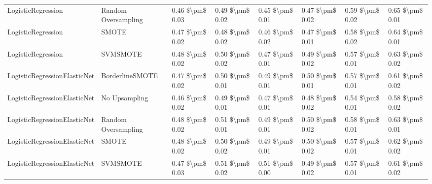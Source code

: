 \begin{tabular}{llllllll}
             LogisticRegression &           Random Oversampling & 0.46 \$\textbackslash pm\$ 0.03 &           0.49 \$\textbackslash pm\$ 0.02 &       0.45 \$\textbackslash pm\$ 0.01 &        0.47 \$\textbackslash pm\$ 0.02 &                         0.59 \$\textbackslash pm\$ 0.02 &     0.65 \$\textbackslash pm\$ 0.01 \\
             LogisticRegression &                         SMOTE & 0.47 \$\textbackslash pm\$ 0.02 &           0.48 \$\textbackslash pm\$ 0.02 &       0.46 \$\textbackslash pm\$ 0.02 &        0.47 \$\textbackslash pm\$ 0.01 &                         0.58 \$\textbackslash pm\$ 0.02 &     0.64 \$\textbackslash pm\$ 0.01 \\
             LogisticRegression &                      SVMSMOTE & 0.48 \$\textbackslash pm\$ 0.02 &           0.50 \$\textbackslash pm\$ 0.02 &       0.47 \$\textbackslash pm\$ 0.01 &        0.49 \$\textbackslash pm\$ 0.02 &                         0.57 \$\textbackslash pm\$ 0.01 &     0.63 \$\textbackslash pm\$ 0.02 \\
   LogisticRegressionElasticNet &               BorderlineSMOTE & 0.47 \$\textbackslash pm\$ 0.02 &           0.50 \$\textbackslash pm\$ 0.01 &       0.49 \$\textbackslash pm\$ 0.01 &        0.50 \$\textbackslash pm\$ 0.01 &                         0.57 \$\textbackslash pm\$ 0.01 &     0.61 \$\textbackslash pm\$ 0.02 \\
   LogisticRegressionElasticNet &                 No Upsampling & 0.46 \$\textbackslash pm\$ 0.02 &           0.49 \$\textbackslash pm\$ 0.01 &       0.47 \$\textbackslash pm\$ 0.01 &        0.48 \$\textbackslash pm\$ 0.02 &                         0.54 \$\textbackslash pm\$ 0.01 &     0.58 \$\textbackslash pm\$ 0.02 \\
   LogisticRegressionElasticNet &           Random Oversampling & 0.48 \$\textbackslash pm\$ 0.02 &           0.51 \$\textbackslash pm\$ 0.01 &       0.49 \$\textbackslash pm\$ 0.01 &        0.50 \$\textbackslash pm\$ 0.02 &                         0.58 \$\textbackslash pm\$ 0.01 &     0.63 \$\textbackslash pm\$ 0.01 \\
   LogisticRegressionElasticNet &                         SMOTE & 0.48 \$\textbackslash pm\$ 0.02 &           0.50 \$\textbackslash pm\$ 0.02 &       0.49 \$\textbackslash pm\$ 0.01 &        0.50 \$\textbackslash pm\$ 0.02 &                         0.57 \$\textbackslash pm\$ 0.01 &     0.62 \$\textbackslash pm\$ 0.02 \\
   LogisticRegressionElasticNet &                      SVMSMOTE & 0.47 \$\textbackslash pm\$ 0.03 &           0.51 \$\textbackslash pm\$ 0.02 &       0.51 \$\textbackslash pm\$ 0.00 &        0.49 \$\textbackslash pm\$ 0.02 &                         0.57 \$\textbackslash pm\$ 0.01 &     0.61 \$\textbackslash pm\$ 0.02 \\

\end{tabular}
